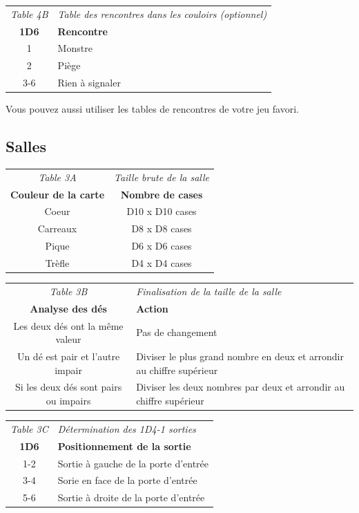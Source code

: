 \documentclass[a4paper, 11pt, twoside]{article}
\begin{document}
\begin{longtable}{cl}
\emph{Table 4B} & \emph{Table des rencontres dans les couloirs (optionnel)}\\
\textbf{1D6} & \textbf{Rencontre}\\
1 & Monstre\\
2 & Piège\\
3-6 & Rien à signaler\\
\end{longtable}

Vous pouvez aussi utiliser les tables de rencontres de votre jeu favori.

\subsection{Salles}
\label{sec:org4ac4021}

\begin{longtable}{cc}
\emph{Table 3A} & \emph{Taille brute de la salle}\\
\textbf{Couleur de la carte} & \textbf{Nombre de cases}\\
Coeur & D10 x D10 cases\\
Carreaux & D8 x D8 cases\\
Pique & D6 x D6 cases\\
Trèfle & D4 x D4 cases\\
\end{longtable}


\begin{longtable}{cl}
\emph{Table 3B} & \emph{Finalisation de la taille de la salle}\\
\textbf{Analyse des dés} & \textbf{Action}\\
Les deux dés ont la même valeur & Pas de changement\\
Un dé est pair et l'autre impair & Diviser le plus grand nombre en deux et arrondir au chiffre supérieur\\
Si les deux dés sont pairs ou impairs & Diviser les deux nombres par deux et arrondir au chiffre supérieur\\
\end{longtable}


\begin{longtable}{cl}
\emph{Table 3C} & \emph{Détermination des 1D4-1 sorties}\\
\textbf{1D6} & \textbf{Positionnement de la sortie}\\
1-2 & Sortie à gauche de la porte d'entrée\\
3-4 & Sorie en face de la porte d'entrée\\
5-6 & Sortie à droite de la porte d'entrée\\
\end{longtable}
\end{document}
